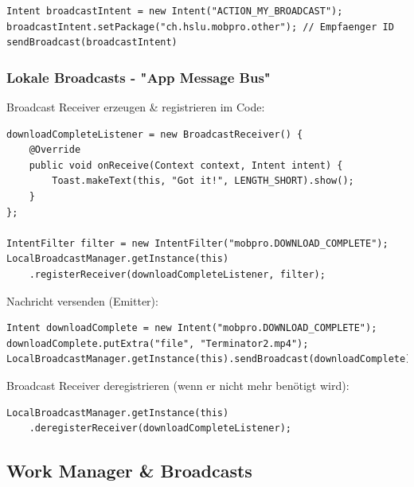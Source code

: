 \documentclass[a4paper]{article}
\begin{document}
		\begin{lstlisting}
Intent broadcastIntent = new Intent("ACTION_MY_BROADCAST");
broadcastIntent.setPackage("ch.hslu.mobpro.other"); // Empfaenger ID
sendBroadcast(broadcastIntent)
		\end{lstlisting}
		
		\newpage
		
		\subsubsection{Lokale Broadcasts - "App Message Bus"}
		
		Broadcast Receiver erzeugen \& registrieren im Code:
		
		\begin{lstlisting}
downloadCompleteListener = new BroadcastReceiver() {
	@Override
	public void onReceive(Context context, Intent intent) {
		Toast.makeText(this, "Got it!", LENGTH_SHORT).show();
	}
};

IntentFilter filter = new IntentFilter("mobpro.DOWNLOAD_COMPLETE");
LocalBroadcastManager.getInstance(this)
	.registerReceiver(downloadCompleteListener, filter);
		\end{lstlisting}
		\noindent
		Nachricht versenden (Emitter): 
		
		\begin{lstlisting}
Intent downloadComplete = new Intent("mobpro.DOWNLOAD_COMPLETE");
downloadComplete.putExtra("file", "Terminator2.mp4"); LocalBroadcastManager.getInstance(this).sendBroadcast(downloadComplete);
		\end{lstlisting}
		\noindent
		Broadcast Receiver deregistrieren (wenn er nicht mehr benötigt wird): 
		
		\begin{lstlisting}
LocalBroadcastManager.getInstance(this) 
	.deregisterReceiver(downloadCompleteListener);
		\end{lstlisting}
	
	\newpage
	
	\subsection{Work Manager \& Broadcasts}
	
\end{document}
